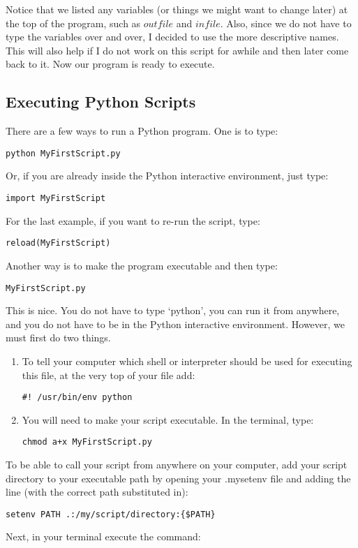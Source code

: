 Notice that we listed any variables (or things we might want to change
later) at the top of the program, such as $outfile$ and $infile$.
Also, since we do not have to type the variables over and over, I
decided to use the more descriptive names.  This will also help if I
do not work on this script for awhile and then later come back to it.
Now our program is ready to execute.

\subsection{Executing Python Scripts}

There are a few ways to run a Python program.  One is to type:

\texttt{\termtab python MyFirstScript.py}

Or, if you are already inside the Python interactive environment, just
type:

\texttt{\pytab import MyFirstScript}

For the last example, if you want to re-run the script, type:

\texttt{\pytab reload(MyFirstScript)}

Another way is to make the program executable and then type:

\texttt{\termtab MyFirstScript.py}

This is nice.  You do not have to type `python', you can run it from
anywhere, and you do not have to be in the Python interactive
environment.  However, we must first do two things.
\begin{enumerate}
\item To tell your computer which shell or interpreter should be used
  for executing this file, at the very top of your file add:

  \texttt{\#! /usr/bin/env python}

\item You will need to make your script executable.  In the terminal,
  type:

  \texttt{\termtab chmod a+x MyFirstScript.py}  
\end{enumerate}

To be able to call your script from anywhere on your computer, add
your script directory to your executable path by opening your
.mysetenv file and adding the line (with the correct path substituted
in):

\texttt{setenv PATH .:/my/script/directory:\{\$PATH\}}

Next, in your terminal execute the command:

